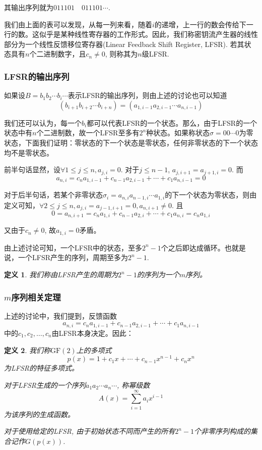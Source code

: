 \documentclass[UTF8]{ctexrep}
\def\pth#1{\left( {#1}\right)}
\def\GF{\mathrm{GF}}
\newtheorem{Definition}{\hspace{2em}定义}[chapter]
\begin{document}
其输出序列就为$011101\quad 011101\cdots$.\par
我们由上面的表可以发现，从每一列来看，随着$i$的递增，上一行的数会传给下一行的数。这似乎是某种线性寄存器的工作形式。因此，我们称密钥流产生器的线性部分为一个线性反馈移位寄存器(Linear Feedback Shift Register, LFSR). 若其状态具有$n$个二进制数字，且$c_n\neq 0$, 则称其为$n$级LFSR.
\subsubsection{LFSR的输出序列}
如果设$B=b_1b_2\cdots b_i\cdots $表示LFSR的输出序列，则由上述的讨论也可以知道
\begin{equation}
    \pth{b_{i+1}b_{i+2}\cdots b_{i+n}}=\pth{a_{1, i-1}a_{2, i-1}\cdots a_{n, i-1}}
\end{equation}

我们还可以认为，每一个$b_i$都可以代表LFSR的一个状态。那么，由于LFSR的一个状态中有$n$个二进制数，故一个LFSR至多有$2^n$种状态。如果称状态$\sigma=00\cdots 0$为零状态，下面我们证明：零状态的下一个状态是零状态，任何非零状态的下一个状态均不是零状态。\par
前半句话显然，设$\forall 1\leq j\leq n, a_{j, i}=0$. 对于$j\leq n-1$, $a_{j, i+1}=a_{j+1, i}=0$. 而
\[a_{n, i}=c_na_{1, i-1}+c_{n-1}a_{2, i-1}+\cdots +c_1a_{n, i-1}=0\]

对于后半句话，若某个非零状态$\sigma_i=a_{n, i}a_{n-1, i}\cdots a_{1, i}$的下一个状态为零状态，则由定义可知，$\forall 2\leq j\leq n, a_{j, i}=a_{j-1, i+1}=0, a_{n, i+1}\neq 0$. 且
\[0=a_{n, i+1}=c_na_{1, i}+c_{n-1}a_{2, i}+\cdots +c_1a_{n, i}=c_na_{1, i}\]

又由于$c_n\neq 0$, 故$a_{1, i}=0$矛盾。\par
由上述讨论可知，一个LFSR中的状态，至多$2^n-1$个之后即达成循环。也就是说，一个LFSR产生的序列，周期至多为$2^n-1$. 
\begin{Definition}
    我们称由LFSR产生的周期为$2^n-1$的序列为一个$m$序列。
\end{Definition}
\subsubsection{$m$序列相关定理}
上述的讨论中，我们提到，反馈函数
\[a_{n, i}=c_na_{1, i-1}+c_{n-1}a_{2, i-1}+\cdots +c_1a_{n, i-1}\]
中的$c_1, c_2,\ldots ,c_n$由LFSR本身决定。因此：
\begin{Definition}
    我们称$\GF\pth{2}$上的多项式
\begin{equation}
    p(x)=1+c_1x+\cdots +c_{n-1}x^{n-1}+c_nx^n
\end{equation}
为LFSR的特征多项式。\par
对于LFSR生成的一个序列$a_1a_2\cdots a_n\cdots$, 称幂级数
\begin{equation}
    A\pth{x}=\sum_{i=1}^{\infty}a_ix^{i-1}
\end{equation}
为该序列的生成函数。\par
对于使用给定的LFSR, 由于初始状态不同而产生的所有$2^n-1$个非零序列构成的集合记作$G\pth{p\pth{x}}$.
\end{Definition}
\end{document}
